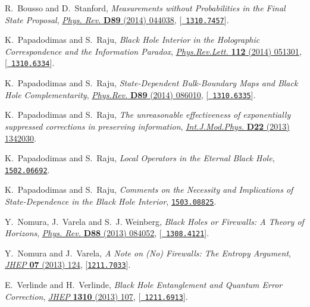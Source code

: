\documentclass[12pt]{article}
\begin{document}
\begin{thebibliography}{100}
R.~Bousso and D.~Stanford, \emph{{Measurements without Probabilities in the
  Final State Proposal}},
  \href{http://dx.doi.org/10.1103/PhysRevD.89.044038}{\emph{Phys. Rev.} {\bf
  D89} (2014) 044038}, [\href{http://arxiv.org/abs/1310.7457}{{\tt
  1310.7457}}].

K.~Papadodimas and S.~Raju, \emph{{Black Hole Interior in the Holographic
  Correspondence and the Information Paradox}},
  \href{http://dx.doi.org/10.1103/PhysRevLett.112.051301}{\emph{Phys.Rev.Lett.}
  {\bf 112} (2014) 051301}, [\href{http://arxiv.org/abs/1310.6334}{{\tt
  1310.6334}}].

K.~Papadodimas and S.~Raju, \emph{{State-Dependent Bulk-Boundary Maps and Black
  Hole Complementarity}},
  \href{http://dx.doi.org/10.1103/PhysRevD.89.086010}{\emph{Phys.Rev.} {\bf
  D89} (2014) 086010}, [\href{http://arxiv.org/abs/1310.6335}{{\tt
  1310.6335}}].

K.~Papadodimas and S.~Raju, \emph{{The unreasonable effectiveness of
  exponentially suppressed corrections in preserving information}},
  \href{http://dx.doi.org/10.1142/S0218271813420303}{\emph{Int.J.Mod.Phys.}
  {\bf D22} (2013) 1342030}.

K.~Papadodimas and S.~Raju, \emph{{Local Operators in the Eternal Black Hole}},
   \href{http://arxiv.org/abs/1502.06692}{{\tt 1502.06692}}.

K.~Papadodimas and S.~Raju, \emph{{Comments on the Necessity and Implications
  of State-Dependence in the Black Hole Interior}},
  \href{http://arxiv.org/abs/1503.08825}{{\tt 1503.08825}}.

Y.~Nomura, J.~Varela and S.~J. Weinberg, \emph{{Black Holes or Firewalls: A
  Theory of Horizons}},
  \href{http://dx.doi.org/10.1103/PhysRevD.88.084052}{\emph{Phys. Rev.} {\bf
  D88} (2013) 084052}, [\href{http://arxiv.org/abs/1308.4121}{{\tt
  1308.4121}}].

Y.~Nomura and J.~Varela, \emph{{A Note on (No) Firewalls: The Entropy
  Argument}}, \href{http://dx.doi.org/10.1007/JHEP07(2013)124}{\emph{JHEP} {\bf
  07} (2013) 124}, [\href{http://arxiv.org/abs/1211.7033}{{\tt 1211.7033}}].

E.~Verlinde and H.~Verlinde, \emph{{Black Hole Entanglement and Quantum Error
  Correction}}, \href{http://dx.doi.org/10.1007/JHEP10(2013)107}{\emph{JHEP}
  {\bf 1310} (2013) 107}, [\href{http://arxiv.org/abs/1211.6913}{{\tt
  1211.6913}}].


\end{thebibliography}
\end{document}
